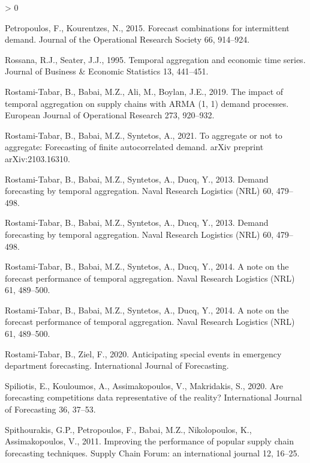 \documentclass[]{elsarticle} %
\newlength{\cslhangindent}
\newenvironment{CSLReferences}[2] %
 {%
  \setlength{\parindent}{0pt}
  \ifodd #1 \everypar{\setlength{\hangindent}{\cslhangindent}}\ignorespaces\fi
  \ifnum #2 > 0
  \setlength{\parskip}{#2\baselineskip}
  \fi
 }%
 {}
\begin{document}
\begin{CSLReferences}{1}{0}
\leavevmode\hypertarget{ref-petropoulos2015forecast}{}%
Petropoulos, F., Kourentzes, N., 2015. Forecast combinations for
intermittent demand. Journal of the Operational Research Society 66,
914--924.

\leavevmode\hypertarget{ref-rossana1995temporal}{}%
Rossana, R.J., Seater, J.J., 1995. Temporal aggregation and economic
time series. Journal of Business \& Economic Statistics 13, 441--451.

\leavevmode\hypertarget{ref-rostami2019impact}{}%
Rostami-Tabar, B., Babai, M.Z., Ali, M., Boylan, J.E., 2019. The impact
of temporal aggregation on supply chains with ARMA (1, 1) demand
processes. European Journal of Operational Research 273, 920--932.

\leavevmode\hypertarget{ref-rostami2021aggregate}{}%
Rostami-Tabar, B., Babai, M.Z., Syntetos, A., 2021. To aggregate or not
to aggregate: Forecasting of finite autocorrelated demand. arXiv
preprint arXiv:2103.16310.

\leavevmode\hypertarget{ref-rostami2013demand}{}%
Rostami-Tabar, B., Babai, M.Z., Syntetos, A., Ducq, Y., 2013. Demand
forecasting by temporal aggregation. Naval Research Logistics (NRL) 60,
479--498.

\leavevmode\hypertarget{ref-rostami2013demand}{}%
Rostami-Tabar, B., Babai, M.Z., Syntetos, A., Ducq, Y., 2013. Demand
forecasting by temporal aggregation. Naval Research Logistics (NRL) 60,
479--498.

\leavevmode\hypertarget{ref-rostami2014note}{}%
Rostami-Tabar, B., Babai, M.Z., Syntetos, A., Ducq, Y., 2014. A note on
the forecast performance of temporal aggregation. Naval Research
Logistics (NRL) 61, 489--500.

\leavevmode\hypertarget{ref-rostami2014note}{}%
Rostami-Tabar, B., Babai, M.Z., Syntetos, A., Ducq, Y., 2014. A note on
the forecast performance of temporal aggregation. Naval Research
Logistics (NRL) 61, 489--500.

\leavevmode\hypertarget{ref-rostami2020anticipating}{}%
Rostami-Tabar, B., Ziel, F., 2020. Anticipating special events in
emergency department forecasting. International Journal of Forecasting.

\leavevmode\hypertarget{ref-Spiliotis2020}{}%
Spiliotis, E., Kouloumos, A., Assimakopoulos, V., Makridakis, S., 2020.
Are forecasting competitions data representative of the reality?
International Journal of Forecasting 36, 37--53.

\leavevmode\hypertarget{ref-spithourakis2011improving}{}%
Spithourakis, G.P., Petropoulos, F., Babai, M.Z., Nikolopoulos, K.,
Assimakopoulos, V., 2011. Improving the performance of popular supply
chain forecasting techniques. Supply Chain Forum: an international
journal 12, 16--25.


\end{CSLReferences}
\end{document}
